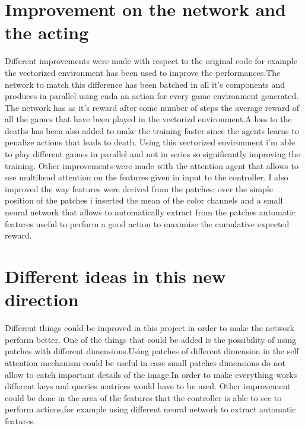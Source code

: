 \documentclass{article}
\begin{document}
\section{Improvement on the network and the acting}
Different improvements were made with respect to the original code for example the vectorized environment has been used to improve the performances.The network to match this difference has been batched in all it's components and produces in parallel using cuda an action for every game environment generated.
The network has as it's reward after some number of steps the average reward of all the games that have been played in the vectorizd environment.A loss to the deaths has been also added to make the training faster since the agents learns to penalize actions that leads to death.
Using this vectorized environment i'm able to play different games in parallel and not in series so significantly improving the training.
Other improvements were made with the attention agent that allows to use multihead attention on the features given in input to the controller.
I also improved the way features were derived from the patches:
over the simple position of the patches i inserted the mean of the color channels and a small neural network that allows to automatically extract from the patches automatic features useful to perform a good action to maximize the cumulative expected reward.

\section{Different ideas in this new direction}
Different things could be improved in this project in order to make the network perform better.
One of the things that could be added is the possibility of using patches with different dimensions.Using patches of different dimension in the self attention mechanism could be useful in case small patches dimensions do not allow to catch important details of the image.In order to make everything works different keys and queries matrices would have to be used.
Other improvement could be done in the area of the features that the controller is able to see to perform actions,for example using different neural network to extract automatic features.
\end{document}
